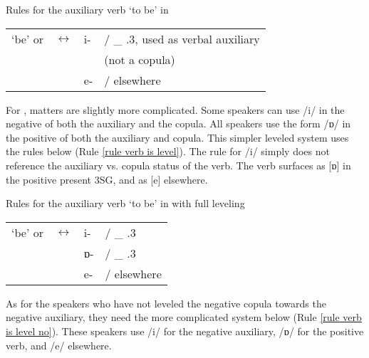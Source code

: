 \begin{newruleblock}{Rules for the auxiliary verb `to be' in {\seaSE}}%
	
	\begin{center}
		\begin{tabular}{llll}
			`be' or {\auxgloss}  & $\leftrightarrow$ & {{i-}} &/ {\neggloss} \_ {\prs}.3{\sg}, used as verbal auxiliary\\
								 &                   &        & \hphantom{/}  (not a copula)\\
								 &                 & {e-} &/ elsewhere
		\end{tabular}
	\end{center}
\end{newruleblock}


For {\iaIA}, matters are slightly more complicated. Some speakers can use /{i}/ in the negative of both the auxiliary and the copula. All speakers use the form /{ɒ}/ in the positive of both the auxiliary and copula. This simpler leveled system uses the rules below (Rule \ref{rule verb is level}). The rule for /{i}/ simply does not reference the auxiliary vs. copula status of the verb. The verb surfaces as [{ɒ}] in the positive present 3SG, and as [{e}] elsewhere.

\begin{newruleblock}{Rules for the auxiliary verb `to be' in {\iaIA} with full leveling}%
	
	\begin{center}
		\begin{tabular}{llll}
					`be' or {\auxgloss} & $\leftrightarrow$ & {i-} &/ {\neggloss} \_ {\prs}.3{\sg} \\
			&&{ɒ-} &/ \_ {\prs}.3{\sg} \\
			& & {e-} &/ elsewhere
		\end{tabular}
	\end{center}
\end{newruleblock}


As for the speakers who have not leveled the negative copula towards the negative auxiliary, they need the more complicated system below (Rule \ref{rule verb is level no}). These speakers use /{i}/ for the negative auxiliary, /{ɒ}/ for the positive verb, and /{e}/ elsewhere. 

